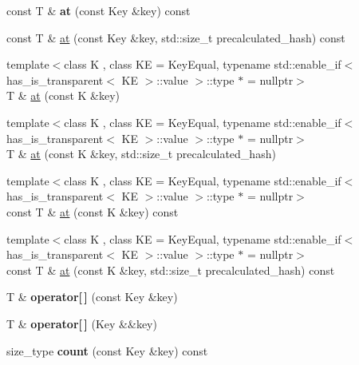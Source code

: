 \begin{DoxyCompactItemize}
const T \& {\bfseries at} (const Key \&key) const
\item 
const T \& \mbox{\hyperlink{classtsl_1_1robin__map_a7f6fe2f99f3f394be2dff42a42d74711}{at}} (const Key \&key, std\+::size\+\_\+t precalculated\+\_\+hash) const
\item 
{\footnotesize template$<$class K , class KE  = Key\+Equal, typename std\+::enable\+\_\+if$<$ has\+\_\+is\+\_\+transparent$<$ K\+E $>$\+::value $>$\+::type $\ast$  = nullptr$>$ }\\T \& \mbox{\hyperlink{classtsl_1_1robin__map_aad9799a35580d252f365a415e769341a}{at}} (const K \&key)
\item 
{\footnotesize template$<$class K , class KE  = Key\+Equal, typename std\+::enable\+\_\+if$<$ has\+\_\+is\+\_\+transparent$<$ K\+E $>$\+::value $>$\+::type $\ast$  = nullptr$>$ }\\T \& \mbox{\hyperlink{classtsl_1_1robin__map_a9404d5336af0f621773a83da4c65a665}{at}} (const K \&key, std\+::size\+\_\+t precalculated\+\_\+hash)
\item 
{\footnotesize template$<$class K , class KE  = Key\+Equal, typename std\+::enable\+\_\+if$<$ has\+\_\+is\+\_\+transparent$<$ K\+E $>$\+::value $>$\+::type $\ast$  = nullptr$>$ }\\const T \& \mbox{\hyperlink{classtsl_1_1robin__map_afb148e953f4f5a2e639f3e6d72dbab6d}{at}} (const K \&key) const
\item 
{\footnotesize template$<$class K , class KE  = Key\+Equal, typename std\+::enable\+\_\+if$<$ has\+\_\+is\+\_\+transparent$<$ K\+E $>$\+::value $>$\+::type $\ast$  = nullptr$>$ }\\const T \& \mbox{\hyperlink{classtsl_1_1robin__map_a7e91f5663f1ee79235803ecfed3057f2}{at}} (const K \&key, std\+::size\+\_\+t precalculated\+\_\+hash) const
\item 
\mbox{\label{classtsl_1_1robin__map_a392f22448edfdd0c7da62500b0044467}} 
T \& {\bfseries operator\mbox{[}$\,$\mbox{]}} (const Key \&key)
\item 
\mbox{\label{classtsl_1_1robin__map_ad372adb464c2070fdc0cfdb0f5dc4efe}} 
T \& {\bfseries operator\mbox{[}$\,$\mbox{]}} (Key \&\&key)
\item 
\mbox{\label{classtsl_1_1robin__map_a18c8de895c524cf166a7c8866e634218}} 
size\+\_\+type {\bfseries count} (const Key \&key) const
\item 

\end{DoxyCompactItemize}
